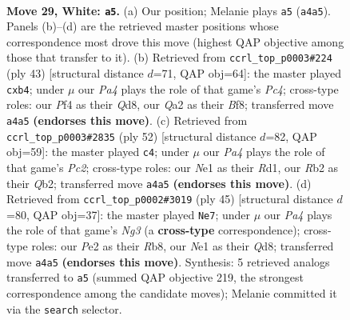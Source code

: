\documentclass[11pt]{article}
\begin{document}
\clearpage

\begin{figure}[p]\centering
\begin{subfigure}{0.46\textwidth}\centering
\resizebox{\linewidth}{!}{%
\newchessgame
\chessboard[
  setfen={1r1q2k1/p1n1brn1/b5pp/2p2p2/P2p1P2/1P2N1P1/QR2P1BP/2BRN1K1 w - - 2 29},
  showmover=false,
  pgfstyle=straightmove, color=movearrow, markmove={a4-a5}
]}
\caption{}
\end{subfigure}\hfill
\begin{subfigure}{0.46\textwidth}\centering
\resizebox{\linewidth}{!}{%
\newchessgame
\chessboard[
  setfen={1r1qrbk1/1b1n1p2/3p2pp/1pp5/1P2Pn2/P4N1P/2B2PP1/B1RQRNK1 b - - 1 22},
  showmover=false,
  pgfstyle=straightmove, color=movearrow, markmove={c5-b4}
]}
\caption{}
\end{subfigure}
\\[4pt]
\begin{subfigure}{0.46\textwidth}\centering
\resizebox{\linewidth}{!}{%
\newchessgame
\chessboard[
  setfen={1rr3k1/4qpp1/p1bppb1p/N3n3/3BP3/1P3P2/1QP1N1PP/R2R3K w - - 7 27},
  showmover=false,
  pgfstyle=straightmove, color=movearrow, markmove={c2-c4}
]}
\caption{}
\end{subfigure}\hfill
\begin{subfigure}{0.46\textwidth}\centering
\resizebox{\linewidth}{!}{%
\newchessgame
\chessboard[
  setfen={1r1qrbk1/3b1pp1/pp1p1nnp/3P4/P5P1/4BNNP/1P3PB1/R2QR1K1 b - - 4 23},
  showmover=false,
  pgfstyle=straightmove, color=movearrow, markmove={g6-e7}
]}
\caption{}
\end{subfigure}
\caption{\textbf{Move 29, White: \texttt{a5}.} (a) Our position; Melanie plays \texttt{a5} (\texttt{a4a5}). Panels (b)--(d) are the retrieved master positions whose correspondence most drove this move (highest QAP objective among those that transfer to it). (b) Retrieved from \texttt{ccrl\_top\_p0003\#224} (ply 43) [structural distance $d$=71, QAP obj=64]: the master played \texttt{cxb4}; under $\mu$ our \emph{Pa4} plays the role of that game's \emph{Pc4}; cross-type roles: our \emph{P}f4 as their \emph{Q}d8, our \emph{Q}a2 as their \emph{B}f8; transferred move \texttt{a4a5} \textbf{(endorses this move)}. (c) Retrieved from \texttt{ccrl\_top\_p0003\#2835} (ply 52) [structural distance $d$=82, QAP obj=59]: the master played \texttt{c4}; under $\mu$ our \emph{Pa4} plays the role of that game's \emph{Pc2}; cross-type roles: our \emph{N}e1 as their \emph{R}d1, our \emph{R}b2 as their \emph{Q}b2; transferred move \texttt{a4a5} \textbf{(endorses this move)}. (d) Retrieved from \texttt{ccrl\_top\_p0002\#3019} (ply 45) [structural distance $d$=80, QAP obj=37]: the master played \texttt{Ne7}; under $\mu$ our \emph{Pa4} plays the role of that game's \emph{Ng3} (a \textbf{cross-type} correspondence); cross-type roles: our \emph{P}e2 as their \emph{R}b8, our \emph{N}e1 as their \emph{Q}d8; transferred move \texttt{a4a5} \textbf{(endorses this move)}. Synthesis: 5 retrieved analogs transferred to \texttt{a5} (summed QAP objective 219, the strongest correspondence among the candidate moves); Melanie committed it via the \texttt{search} selector.}
\label{fig:thought-m56}
\end{figure}
\end{document}
